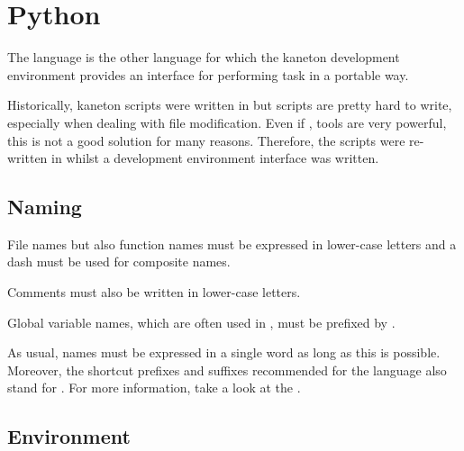 %
%
%
%
%
%

%
%

\section{Python}
\label{section:python}

The  language is the other language for which the kaneton
development environment provides an interface for performing task in
a portable way.

Historically, kaneton scripts were written in  but scripts
are pretty hard to write, especially when dealing with file modification.
Even if ,  \etc{} tools are very powerful, this
is not a good solution for many reasons. Therefore, the scripts were
re-written in  whilst a  development environment
interface was written.

%
%

\subsection{Naming}

File names but also function names must be expressed in lower-case letters
and a dash must be used for composite names.

Comments must also be written in lower-case letters.

Global variable names, which are often used in , must be
prefixed by .

As usual, names must be expressed in a single word as long as this is possible.
Moreover, the shortcut prefixes and suffixes recommended for the 
language also stand for . For more information, take a look
at the .


\subsection{Environment}

